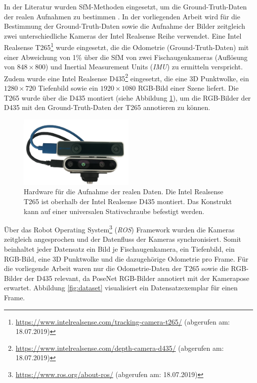 In der Literatur wurden SfM-Methoden eingesetzt, um die Ground-Truth-Daten der realen Aufnahmen zu bestimmen \cite{kendallPoseNetConvolutionalNetwork2015, clarkVidLocDeepSpatioTemporal2017, acharyaBIMPoseNetIndoorCamera2019}. 
In der vorliegenden Arbeit wird für die Bestimmung der Ground-Truth-Daten sowie die Aufnahme der Bilder zeitgleich zwei unterschiedliche Kameras der Intel Realsense Reihe verwendet. Eine Intel Realsense T265\footnote{\url{https://www.intelrealsense.com/tracking-camera-t265/} (abgerufen am: 18.07.2019)} wurde eingesetzt, die die Odometrie (Ground-Truth-Daten) mit einer Abweichung von 1\%  über die SfM von zwei Fischaugenkameras (Auflösung von $848 \times 800$) und Inertial Measurement Units (\textit{IMU}) zu ermitteln verspricht. Zudem wurde eine Intel Realsense D435\footnote{ \url{https://www.intelrealsense.com/depth-camera-d435/} (abgerufen am: 18.07.2019)} eingesetzt, die eine 3D Punktwolke, ein $1280\times720$ Tiefenbild sowie ein $1920\times1080$ RGB-Bild einer Szene liefert. Die T265 wurde über die D435 montiert (siehe Abbildung \ref{fig:t265_d435}), um die RGB-Bilder der D435 mit den Ground-Truth-Daten der T265 annotieren zu können.

\begin{figure}
	\centering
	\includegraphics[width=0.5\textwidth]{images/real_dataset/t265_d435_2.png}
	\caption{Hardware für die Aufnahme der realen Daten. Die Intel Realsense T265 ist oberhalb der Intel Realsense D435 montiert. Das Konstrukt kann auf einer universalen Stativschraube befestigt werden.  }
	\label{fig:t265_d435}
\end{figure}

Über das Robot Operating System\footnote{\url{https://www.ros.org/about-ros/} (abgerufen am: 18.07.2019)} (\textit{ROS}) Framework wurden die Kameras zeitgleich angesprochen und der Datenfluss der Kameras synchronisiert. Somit beinhaltet jeder Datensatz ein Bild je Fischaugenkamera, ein Tiefenbild, ein RGB-Bild, eine 3D Punktwolke und die dazugehörige Odometrie pro Frame. Für die vorliegende Arbeit waren nur die Odometrie-Daten der T265 sowie die RGB-Bilder der D435 relevant, da PoseNet RGB-Bilder annotiert mit der Kamerapose erwartet. Abbildung \ref{fig:dataset} visualisiert ein Datensatzexemplar für einen Frame.

